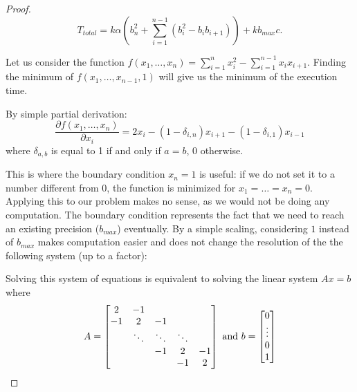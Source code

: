 \begin{proof}
    \begin{equation}
        T_{total}  = k\alpha\left(b_n^2 + \sum\limits_{i=1}^{n-1} (b_i^2 - b_i b_{i+1})\right) + kb_{max}c.
    \end{equation}

    Let us consider the function $f(x_1,\dots,x_n) = \sum\limits_{i=1}^n x_i^2
    - \sum\limits_{i=1}^{n-1} x_ix_{i+1}$. Finding the minimum of
    $f(x_1,\dots,x_{n-1},1)$ will give us the minimum of the execution time.

    By simple partial derivation: \[ \frac{\partial f(x_1,\dots,x_n)}{\partial
    x_i} = 2x_i - (1-\delta_{i,n})x_{i+1} - (1-\delta_{i,1})x_{i-1} \] where
    $\delta_{a,b} $ is equal to 1 if and only if $a=b$, 0 otherwise.

    This is where the boundary condition $x_n = 1$ is useful: if we do not set it
    to a number different from 0, the function is minimized for
    $x_1=\dots=x_n=0$. Applying this to our problem makes no sense, as we
    would not be doing any computation. The boundary condition represents the
    fact that we need to reach an existing precision ($b_{max}$) eventually. By
    a simple scaling, considering $1$ instead of $b_{max}$ makes computation
    easier and does not change the resolution of the the following system (up
    to a factor):


    Solving this system of equations is equivalent to solving the linear system $Ax=b$ where
    \[ A =
    \begin{bmatrix}
    2       & -1 &  &  &  \\
    -1       & 2 & -1 &  &  \\
    & \ddots & \ddots & \ddots & \\
    & & -1 & 2 & -1 \\
           &  &  & -1 & 2
    \end{bmatrix}
    \textup{ and } b = \begin{bmatrix} 0 \\ \vdots \\ 0 \\ 1 \end{bmatrix} \]


\end{proof}
